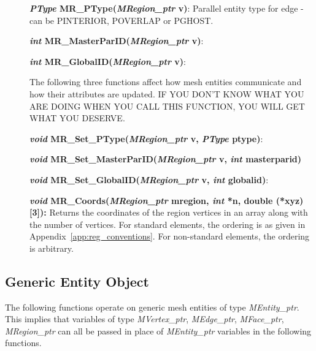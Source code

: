\documentclass[12pt]{article}
\begin{document}
\begin{description}
\item[]

\item[]  {\bf {\em PType} MR\_PType({\em MRegion\_ptr} v)}: Parallel entity type for edge - can be PINTERIOR, POVERLAP or PGHOST.
\item[]  {\bf {\em int}   MR\_MasterParID({\em MRegion\_ptr} v)}:
\item[]  {\bf {\em int}   MR\_GlobalID({\em MRegion\_ptr} v)}:

\item[]
\item[]  The following three functions affect how mesh entities communicate and how their attributes are updated. IF YOU DON'T KNOW WHAT YOU ARE DOING WHEN YOU CALL THIS FUNCTION, YOU WILL GET WHAT YOU DESERVE.
\item[]  {\bf {\em void}  MR\_Set\_PType({\em MRegion\_ptr} v, {\em PType} ptype)}: 
\item[]  {\bf {\em void}  MR\_Set\_MasterParID({\em MRegion\_ptr} v, {\em int} masterparid)}
\item[]  {\bf {\em void}  MR\_Set\_GlobalID({\em MRegion\_ptr} v, {\em int} globalid)}:  

\item[]

\item[]{\bf {\em void} MR\_Coords({\em MRegion\_ptr} mregion,
{\em int} *n, double (*xyz)[3]):} Returns the coordinates of the
region vertices in an array along with the number of vertices. For
standard elements, the ordering is as given in
Appendix~\ref{app:reg_conventions}. For non-standard elements, the
ordering is arbitrary.
\end{description}



\newpage
\subsection{Generic Entity Object}

The following functions operate on generic mesh entities of type
{\em MEntity\_ptr}. This implies that variables of type
{\em MVertex\_ptr}, {\em MEdge\_ptr}, {\em MFace\_ptr},
{\em MRegion\_ptr} can all be passed in place of
{\em MEntity\_ptr} variables in the following functions.
\end{document}
